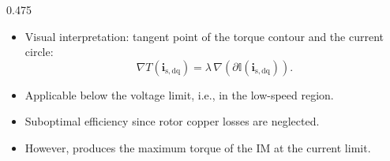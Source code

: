 \begin{frame}
\begin{columns}
\begin{column}{0.475\textwidth}
\begin{itemize}
                      $$J_{\mathrm{OPS}}(\bm{i}_{\mathrm{s,dq}})=\|\bm{i}_{\mathrm{s,dq}}\|_2^2.$$
                \item<2-> Visual interpretation: tangent point of the torque contour and the current circle:
                      $$
                          \nabla T(\bm{i}_{\mathrm{s,dq}})=\lambda\,\nabla(\partial\mathbb{I}(\bm{i}_{\mathrm{s,dq}})).
                      $$
                \item<3-> Applicable below the voltage limit, i.e., in the low-speed region.
                \item<4-> Suboptimal efficiency since rotor copper losses are neglected.
                \item<5-> However, produces the maximum torque of the IM at the current limit.
            \end{itemize}
        \end{column}
    \end{columns}
\end{frame}

